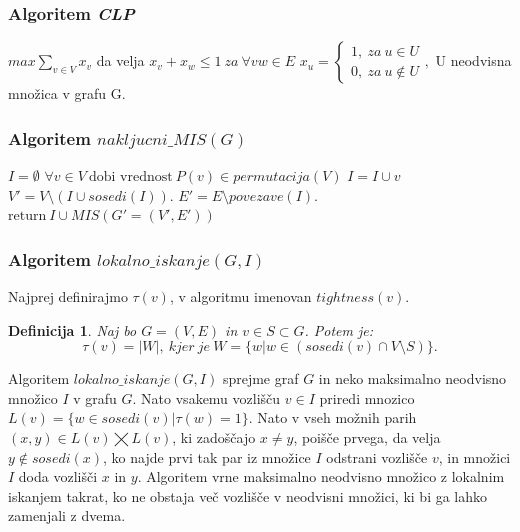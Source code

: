 \documentclass[a4paper, 12pt]{article}
\newtheorem{definicija}{Definicija}
\begin{document}
\subsubsection{Algoritem \textit{CLP}}

\begin{algorithm}
\caption{$CLP(G)$}\label{euclid}
\begin{algorithmic}[1]
\State $max \sum_{v \in V} x_{v}$
\State da velja $x_{v} + x_{w} \leq 1 \ za \ \forall vw \in E$
\State $x_{u} = 
\begin{cases}
1, \ za \ u \in U \\
0, \ za \ u \notin U
\end{cases},$ U neodvisna množica v grafu G.
\end{algorithmic}
\end{algorithm}


\subsubsection{Algoritem \textbf{$nakljucni\_MIS(G)$}}

\newpage

\begin{algorithm}
\caption{$nakljucni\_MIS(G)$}\label{euclid}
\begin{algorithmic}[1]
\State $\textit{I} = \emptyset$
\State $\forall v \in V\ \text{dobi vrednost}\ \textit{P}(v) \in \textit{permutacija}(V)$
\State $ I = I \cup v $
\EndIf
\State $V' = V \setminus (I \cup \textit{sosedi}(I))$.
\State $E' = E \setminus \textit{povezave}(I)$.
\State $\text{return}\  I \cup \textit{MIS}(G'=(V', E'))$
\end{algorithmic}
\end{algorithm}


\subsubsection{Algoritem $lokalno\_iskanje(G, I)$}

Najprej definirajmo $\tau(v)$, v algoritmu imenovan $tightness(v)$.
\begin{definicija}
	Naj bo $G=(V,E)$ in $v \in S \subset G$. Potem je:
	$$\tau(v) = |W|, \ kjer \ je \ W = \{w|w \in (sosedi(v) \cap V \setminus S)\}.$$
\end{definicija}

\noindent Algoritem $lokalno\_iskanje(G, I)$ sprejme graf $G$ in neko maksimalno neodvisno množico $I$ v grafu $G$. Nato vsakemu vozlišču $v \in I$
priredi mnozico $L(v) = \{w \in sosedi(v)| \tau(w) = 1\}$. Nato v vseh možnih parih $(x, y) \in L(v) \bigtimes L(v)$, ki zadoščajo $x \neq y$, 
poišče prvega, da velja $y \notin sosedi(x)$, ko najde prvi tak par iz množice $I$ odstrani vozlišče $v$, in množici $I$ doda vozlišči $x$ in $y$. 
Algoritem vrne maksimalno neodvisno množico z lokalnim iskanjem takrat, ko ne obstaja več vozlišče v neodvisni množici, ki bi ga lahko zamenjali z dvema.
\end{document}
